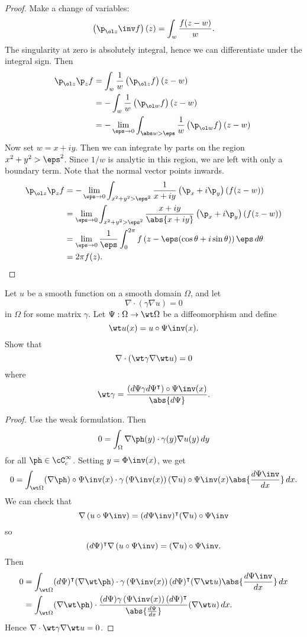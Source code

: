 \begin{proof}
  Make a change of variables:
  \[ \left(\p_{\ol z}\inv f\right)(z) = \int_w \frac{f(z-w)}{w}. \]
  The singularity at zero is absolutely integral, hence we can differentiate under the integral sign.
  Then
  \begin{align*}
    \p_{\ol z}\p_zf &= \int_w \frac1w \left( \p_{\ol z}f \right)(z-w) \\
    &= -\int_w \frac1w \left( \p_{\ol w}f \right)(z-w) \\
    &= -\lim_{\eps\to0}\int_{\abs w>\eps} \frac1w \left( \p_{\ol w}f \right)(z-w)\
  \end{align*}
  Now set $w=x+iy$.
  Then we can integrate by parts on the region $x^2+y^2>\eps^2$.
  Since $1/w$ is analytic in this region, we are left with only a boundary term.
  Note that the normal vector points inwards.
  \begin{align*}
    \p_{\ol z}\p_zf &= -\lim_{\eps\to0}\int_{x^2+y^2>\eps^2} \frac1{x+iy} \left( \p_x+i\p_y \right)\left( f(z-w) \right) \\
    &= \lim_{\eps\to0}\int_{x^2+y^2>\eps^2} \frac{x+iy}{\abs{x+iy}} \left( \p_x+i\p_y \right)\left( f(z-w) \right) \\
    &= \lim_{\eps\to0} \frac1\eps \int_0^{2\pi} f\left( z-\eps(\cos\theta+i\sin\theta) \right) \eps \, d\theta \\
    &= 2\pi f(z).
  \end{align*}
\end{proof}

\begin{exer}
  Let $u$ be a smooth function on a smooth domain $\Omega$, and let
  \[ \nabla\cdot(\gamma\nabla u)=0 \]
  in $\Omega$ for some matrix $\gamma$.
  Let $\Psi:\Omega\to\wt\Omega$ be a diffeomorphism and define
  \[ \wt u(x)=u\circ\Psi\inv(x). \]
  Show that
  \[ \nabla\cdot(\wt\gamma\nabla\wt u)=0 \]
  where
  \[ \wt\gamma=\frac{(d\Psi\gamma d\Psi^\intercal)\circ\Psi\inv(x)}{\abs{d\Psi}}. \]
\end{exer}

\begin{proof}
  Use the weak formulation.
  Then
  \[ 0 = \int_\Omega \nabla\ph(y)\cdot\gamma(y)\nabla u(y)\,dy \]
  for all $\ph\in\cC_c^\infty$.
  Setting $y=\Phi\inv(x)$, we get
  \[ 0 = \int_{\wt\Omega} (\nabla\ph)\circ\Psi\inv(x)\cdot\gamma\left( \Psi\inv(x) \right)(\nabla u)\circ\Psi\inv(x) \abs{\frac{d\Psi\inv}{dx}} \, dx. \]
  We can check that
  \[ \nabla\left( u\circ\Psi\inv \right) = (d\Psi\inv)^\intercal(\nabla u)\circ\Psi\inv \]
  so
  \[ (d\Psi)^\intercal\nabla\left( u\circ\Psi\inv \right) = (\nabla u)\circ\Psi\inv. \]
  Then
  \begin{align*}
    0 &= \int_{\wt\Omega} (d\Psi)^\intercal (\nabla\wt\ph)\cdot\gamma\left( \Psi\inv(x) \right)(d\Psi)^\intercal(\nabla \wt u)\abs{\frac{d\Psi\inv}{dx}} \, dx \\
    &= \int_{\wt\Omega} (\nabla\wt\ph) \cdot \frac{(d\Psi)\gamma\left( \Psi\inv(x) \right)(d\Psi)^\intercal}{\abs{\frac{d\Psi}{dx}}} (\nabla\wt u)\,dx.
  \end{align*}
  Hence $\nabla\cdot\wt\gamma\nabla\wt u=0$.
\end{proof}
